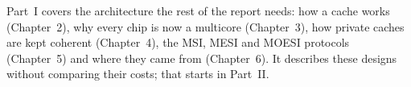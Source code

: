 \begin{center}
\end{center}

\begin{keybox}
Part~I covers the architecture the rest of the report needs: how a cache works
(Chapter~2), why every chip is now a multicore (Chapter~3), how private caches are
kept coherent (Chapter~4), the MSI, MESI and MOESI protocols (Chapter~5) and where
they came from (Chapter~6). It describes these designs without comparing their
costs; that starts in Part~II.
\end{keybox}
